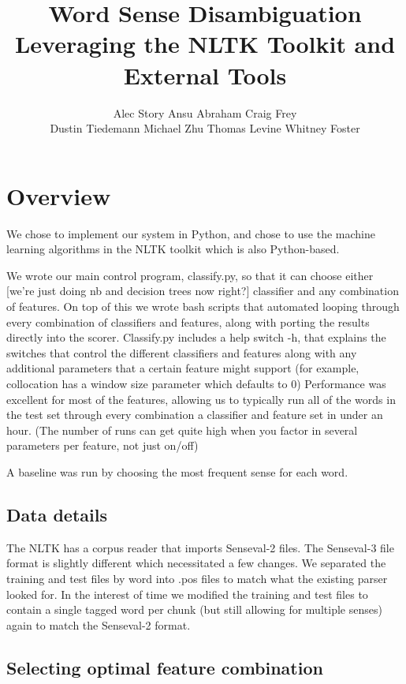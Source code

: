 \documentclass{article}
\title{Word Sense Disambiguation\\
\small{Leveraging the NLTK Toolkit and External Tools}}
\author{
Alec Story
Ansu Abraham
Craig Frey\\
Dustin Tiedemann
Michael Zhu
Thomas Levine
Whitney Foster\\
}
\begin{document}
\maketitle

\section{Overview}

We  chose to implement our system in Python, and chose to use the machine
learning algorithms in the NLTK toolkit which is also Python-based.

We wrote our main control program, classify.py, so that it can choose either
[we're just doing nb and decision trees now right?] classifier and any
combination of  features. On top of this we wrote bash scripts that automated
looping through every combination of classifiers and features, along with
porting the results directly into the scorer.  Classify.py includes a help
switch -h, that explains the switches that control the different classifiers
and features along with any additional parameters that a certain feature might
support (for example, collocation has a window size parameter which defaults to
0) Performance was excellent for most of the features, allowing us to typically
run all of the words in the test set through every combination a classifier and
feature set in under an hour. (The number of runs can get quite high when you
factor in several parameters per feature, not just on/off)

A baseline was run by choosing the most frequent sense for each word.

\subsection{Data details}

The  NLTK has a corpus reader  that imports Senseval-2 files. The Senseval-3
file format is slightly  different which necessitated a few changes. We
separated the training  and test files by word into .pos files to match  what
the existing  parser looked for. In the interest of time we modified  the
training and  test files to contain a single tagged word per chunk  (but still
allowing for multiple senses) again to match the Senseval-2  format.

\subsection{Selecting optimal feature combination}
\newcommand\ward{forward} %
\end{document}
